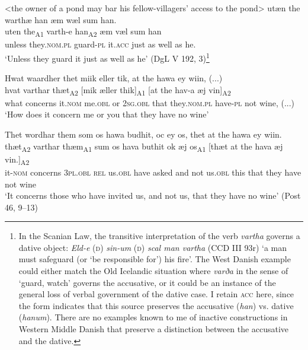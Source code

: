 \documentclass[output=paper]{langscibook}
\begin{document}
\ea \label{ex:heltoft:19a} 
<the owner of a pond may bar his fellow-villagers' access to the pond>
\ea
    \glll utæn   the warthæ   han æm wæl sum han. \\
         uten  the\textsubscript{A1}      varth-e    han\textsubscript{A2}    æm væl    sum han\\
         unless  they.\textsc{nom.pl}  guard-\textsc{pl}  it.\textsc{acc}  {just as} well   as he.\\
    \glt `Unless they guard it just as well as he' (DgL V 192, 3)\footnote{In the Scanian Law, the transitive interpretation of the verb \textit{vartha} governs a dative object: \textit{Eld-e} (\textsc{d}) \textit{sin-um} (\textsc{d)} \textit{scal man vartha} (CCD III 93r) ‘a man must safeguard (or ‘be responsible for') his fire'. The West Danish example could either match the Old Icelandic situation where \textit{varða} in the sense of ‘guard, watch' governs the accusative, or it could be an instance of the general loss of verbal government of the dative case. I retain \textsc{acc} here, since the form indicates that this source preserves the accusative (\textit{han}) vs. dative (\textit{hanum}). There are no examples known to me of inactive constructions in Western Middle Danish that preserve a distinction between the accusative and the dative.}

\ex \label{ex:heltoft:19b}
    \glll Hwat waardher thet miik eller tik, at the hawa ey wiin, (...)\\
          hvat  varthar    thæt\textsubscript{A2}   [mik    æller  thik]\textsubscript{A1}  [at     the       hav-a    æj     vin]\textsubscript{A2}\\
        what  concerns  it.\textsc{nom}    me.\textsc{obl}   or    \textsc{2sg.obl} that   they.\textsc{nom.pl}   have-\textsc{pl}   not   wine, (...)\\
    \glt ‘How does it concern me or you that they have no wine'

\ex \label{ex:heltoft:19c} 
    \glll Thet wordhar them som os hawa budhit, oc ey os, thet at the hawa ey wiin.\\
         thæt\textsubscript{A2} varthar    thæm\textsubscript{A1}  sum os     hava  buthit  ok æj    os\textsubscript{A1} [thæt     at     the   hava   æj     vin.]\textsubscript{A2}\\
         it-\textsc{nom}   concerns  \textsc{3pl.obl}  \textsc{rel} us.\textsc{obl}  have   asked     and not   us.\textsc{obl} this     that  they   have   not    wine\\
    \glt ‘It concerns those who have invited us, and not us, that they have no wine' (Post 46, 9--13)
\z\z
\end{document}
